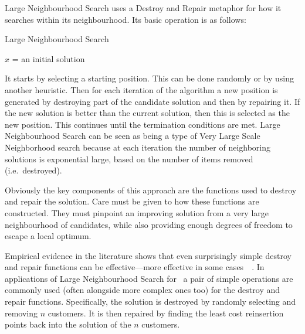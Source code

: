 Large Neighbourhood Search uses a Destroy and Repair metaphor for how it searches within its neighbourhood. Its basic operation is as follows:

\begin{algorithm}[H]
   \caption{Large Neighbourhood Search}
   $x$ = an initial solution\\
\end{algorithm}

It starts by selecting a starting position. This can be done randomly or by using another heuristic. Then for each iteration of the algorithm a new position is generated by destroying part of the candidate solution and then by repairing it. If the new solution is better than the current solution, then this is selected as the new position. This continues until the termination conditions are met. Large Neighbourhood Search can be seen as being a type of Very Large Scale Neighborhood search because at each iteration the number of neighboring solutions is exponential large, based on the number of items removed (i.e.~destroyed).

Obviously the key components of this approach are the functions used to destroy and repair the solution. Care must be given to how these functions are constructed. They must pinpoint an improving solution from a very large neighbourhood of candidates, while also providing enough degrees of freedom to escape a local optimum.

Empirical evidence in the literature shows that even surprisingly simple destroy and repair functions can be effective---more effective in some cases~\cite{Shaw:1998}~\cite{Ropke:2005}. In applications of Large Neighbourhood Search for \VRP\ a pair of simple operations are commonly used (often alongside more complex ones too) for the destroy and repair functions. Specifically, the solution is destroyed by randomly selecting and removing $n$ customers. It is then repaired by finding the least cost reinsertion points back into the solution of the $n$ customers.

